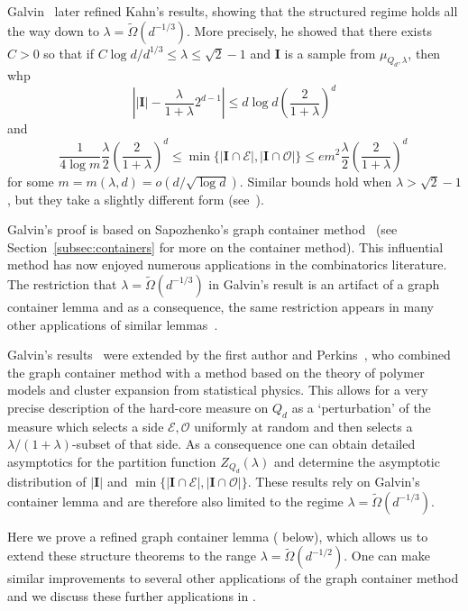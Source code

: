 \documentclass[a4paper]{amsart}
\theoremstyle{definition}
\newcommand{\cO}{\mathcal{O} }
\newcommand{\cE}{\mathcal{E} }
\newcommand{\0}[0]{\emptyset}
\newcommand{\lam}{\lambda}
\begin{document}
Galvin~\cite{galvin_threshold} later refined Kahn's results, showing that the structured regime holds all the way down to $\lam=\tilde \Omega(d^{-1/3})$. More precisely, he showed that there exists $C>0$ so that if $ C \log d/d^{1/3}\leq \lam \leq \sqrt{2}-1$ and $\mathbf I$ is a sample from $\mu_{Q_d,\lam}$, then whp
\[
\left||\mathbf I| - \frac{\lam}{1+\lam}2^{d-1} \right|\leq d \log d \left(\frac{2}{1+\lam} \right)^d
\]
and 
\[
\frac{1}{4 \log m}\frac{\lam}{2}\left(\frac{2}{1+\lam} \right)^d\leq \min\{|\mathbf I \cap \cE|, |\mathbf I \cap \cO |\}\leq em^2\frac{\lam}{2}\left(\frac{2}{1+\lam} \right)^d\, 
\]
for some $m=m(\lam,d)=o(d/\sqrt{\log d})$. Similar bounds hold when $\lam>\sqrt{2}-1$, but they take a slightly different form (see~\cite[Theorem 1.1]{galvin_threshold}). 

 Galvin's proof is based on Sapozhenko's graph container method~\cite{sapocontainer} (see Section~\ref{subsec:containers} for more on the container method). This influential method has now enjoyed numerous applications in the combinatorics literature. The restriction that $\lam=\tilde \Omega(d^{-1/3})$ in Galvin's result is an artifact of a graph container lemma and as a consequence, the same restriction appears in many other applications of similar lemmas~\cite{balogh2021independent,galvin2006slow,struct,jenssen2023approximately,kronenberg2022independent}.

 Galvin's results~\cite{galvin_threshold} were extended by the first author and Perkins~\cite{hypercube}, who combined the graph container method with a method based on the theory of polymer models and cluster expansion from statistical physics. This allows for a very precise description of the hard-core measure on $Q_d$ as a `perturbation' of the measure which selects a side $\cE,\cO$ uniformly at random and then selects a $\lam/(1+\lam)$-subset of that side. As a consequence one can obtain detailed asymptotics for the partition function $Z_{Q_d}(\lam)$ and determine the asymptotic distribution of $|\mathbf I|$ and $\min\{|\mathbf I \cap \cE|, |\mathbf I \cap \cO |\}$. These results rely on Galvin's container lemma and are therefore also limited to the regime $\lam=\tilde\Omega(d^{-1/3})$.


Here we prove a refined graph container lemma ( below), which allows us to extend these structure theorems to the range $\lam=\tilde \Omega(d^{-1/2})$. One can make similar improvements to several other applications of the graph container method and we discuss these further applications in . 
\end{document}
